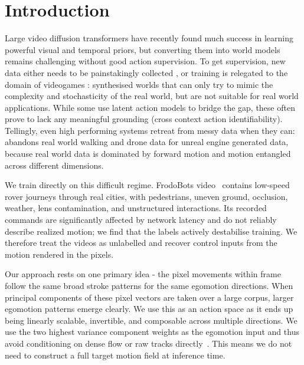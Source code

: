 \documentclass[letterpaper]{article} %
\begin{document}

\section{Introduction}

Large video diffusion transformers have recently found much success in learning powerful visual and temporal priors, but converting them into world models remains challenging without good action supervision. To get supervision, new data either needs to be painstakingly collected \cite{navwormod, cameracontrol2, cosmos2, uniwm, xworld, gaia2}, or training is relegated to the domain of videogames \cite{gamengen2024, diamond, olafworld, mineworld, gamefactory, oasis2}: synthesised worlds that can only try to mimic the complexity and stochasticity of the real world, but are not suitable for real world applications. While some \cite{genie, gamengen2024, olafworld, adaworld} use latent action models to bridge the gap, these often prove to lack any meaningful grounding (cross context action identifiability). Tellingly, even high performing systems retreat from messy data when they can: ~\citet{relic} abandons real world walking and drone data for unreal engine generated data, because real world data is dominated by forward motion and motion entangled across different dimensions.

We train directly on this difficult regime. FrodoBots
video~\cite{frodobots} contains low-speed rover journeys through real cities,
with pedestrians, uneven ground, occlusion, weather, lens contamination, and
unstructured interactions. Its recorded commands are significantly affected by network latency and do not reliably describe realized motion; we find that the labels actively destabilise training. We therefore treat the videos as unlabelled and recover control inputs from the motion rendered in the pixels.

Our approach rests on one primary idea - the pixel movements within frame follow the same broad stroke patterns for the same egomotion directions. When principal components of these pixel vectors are taken over a large corpus, larger egomotion patterns emerge clearly. We use this as an action space as it ends up being linearly scalable, invertible, and composable across multiple directions. We use the two highest variance component weights as the egomotion input and thus avoid conditioning on dense flow or raw tracks
directly~\cite{flovd,motionprompting,onlyflow}. This means we do not need to construct a full target motion
field at inference time.
\end{document}

